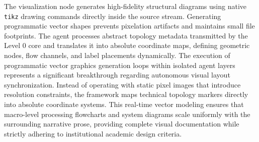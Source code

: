 \begin{table}[htbp]
\noindent{}
\caption{Multi-Agent Self-Healing State Transitions and Remediation Protocol Mappings.}
\end{table}

The visualization node generates high-fidelity structural diagrams using native \texttt{tikz} drawing commands directly inside the source stream. Generating programmatic vector shapes prevents pixelation artifacts and maintains small file footprints. The agent processes abstract topology metadata transmitted by the Level 0 core and translates it into absolute coordinate maps, defining geometric nodes, flow channels, and label placements dynamically. The execution of programmatic vector graphics generation loops within isolated agent layers represents a significant breakthrough regarding autonomous visual layout synchronization. Instead of operating with static pixel images that introduce resolution constraints, the framework maps technical topology markers directly into absolute coordinate systems. This real-time vector modeling ensures that macro-level processing flowcharts and system diagrams scale uniformly with the surrounding narrative prose, providing complete visual documentation while strictly adhering to institutional academic design criteria.

